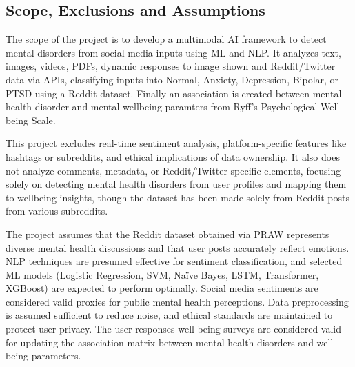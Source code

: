 \subsection{Scope, Exclusions and Assumptions}
\noindent
The scope of the project is to develop a multimodal AI framework to detect mental disorders from social media inputs using ML and NLP. It analyzes text, images, videos, PDFs, dynamic responses to image shown and Reddit/Twitter data via APIs, classifying inputs into Normal, Anxiety, Depression, Bipolar, or PTSD using a Reddit dataset. Finally an association is created between mental health disorder and mental wellbeing paramters from Ryff's Psychological Well-being Scale.

\vspace{1em}

\noindent
This project excludes real-time sentiment analysis, platform-specific features like hashtags or subreddits, and ethical implications of data ownership. It also does not analyze comments, metadata, or Reddit/Twitter-specific elements, focusing solely on detecting mental health disorders from user profiles and mapping them to wellbeing insights, though the dataset has been made solely from Reddit posts from various subreddits.

\vspace{1em}

\noindent
The project assumes that the Reddit dataset obtained via PRAW represents diverse mental health discussions and that user posts accurately reflect emotions. NLP techniques are presumed effective for sentiment classification, and selected ML models (Logistic Regression, SVM, Naïve Bayes, LSTM, Transformer, XGBoost) are expected to perform optimally. Social media sentiments are considered valid proxies for public mental health perceptions. Data preprocessing is assumed sufficient to reduce noise, and ethical standards are maintained to protect user privacy. The user responses well-being surveys are considered valid for updating the association matrix between mental health disorders and well-being parameters.


